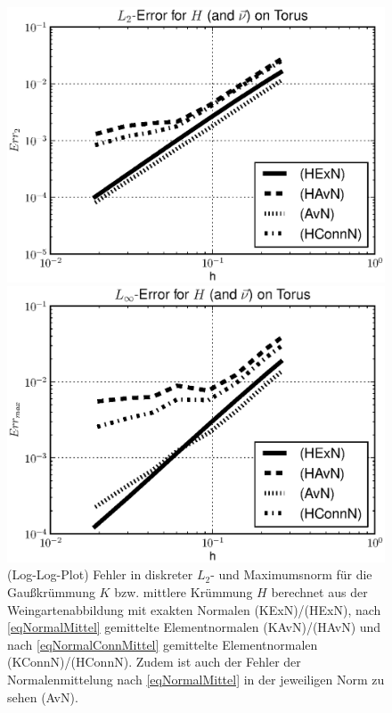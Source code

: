 \begin{beispiel}[Torus]
\begin{figure}
\begin{minipage}[t]{0.49\textwidth}
        \end{minipage}\\
        \begin{minipage}[t]{0.49\textwidth}
          \centering\includegraphics[width=\textwidth]{bilder/Curvature/TorusHWein2Plot.eps}
        \end{minipage}\hfill
        \begin{minipage}[t]{0.49\textwidth}
          \centering\includegraphics[width=\textwidth]{bilder/Curvature/TorusHWeinMaxPlot.eps}
        \end{minipage}
        \caption[Fehler Gauß-/mittlere Krümmung aus Weingartenabb. auf Torus]
                {(Log-Log-Plot) Fehler in diskreter \( L_{2} \)- und Maximumsnorm für die Gaußkrümmung \( K \) bzw. mittlere Krümmung \( H \) berechnet aus
                der Weingartenabbildung mit exakten Normalen (KExN)/(HExN), 
                nach \eqref{eqNormalMittel} gemittelte Elementnormalen (KAvN)/(HAvN) 
                und nach \eqref{eqNormalConnMittel} gemittelte Elementnormalen (KConnN)/(HConnN).
                Zudem ist auch der Fehler der Normalenmittelung nach \eqref{eqNormalMittel} in der jeweiligen Norm zu sehen (AvN).}
        \label{figWeingartenFehlerTorus}
      \end{figure}
    \end{beispiel}

